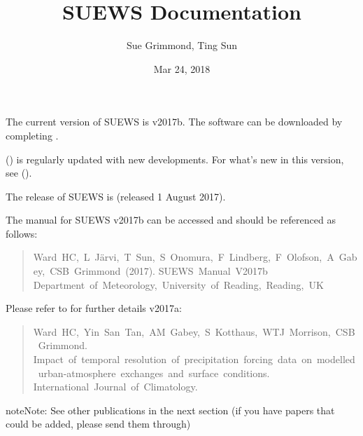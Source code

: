 \documentclass[letterpaper,10pt,english]{sphinxmanual}
\title{SUEWS Documentation}
\date{Mar 24, 2018}
\author{Sue Grimmond, Ting Sun}
\begin{document}
\maketitle
\sphinxtableofcontents
{}\label{\detokenize{index::doc}}


The current version of SUEWS is v2017b. The software can be downloaded
by completing .

{\hyperref[\detokenize{index:index-page}]{}} () is regularly
updated with new developments. For what’s new in this version, see {\hyperref[\detokenize{version-history:new-latest}]{}} ().

The  release of SUEWS is  (released 1 August
2017).

The manual for SUEWS v2017b can be accessed
 and should be referenced as
follows:
\begin{quote}

Ward HC, L Järvi, T Sun, S Onomura, F Lindberg, F Olofson, A Gabey, CSB Grimmond (2017).
SUEWS Manual V2017b Department of Meteorology, University of Reading, Reading, UK
\end{quote}

Please refer to  for
further details v2017a:
\begin{quote}

Ward HC, Yin San Tan, AM Gabey, S Kotthaus, WTJ Morrison, CSB Grimmond.
Impact of temporal resolution of precipitation forcing data on modelled urban-atmosphere exchanges and surface conditions.
International Journal of Climatology.
\end{quote}

\begin{sphinxadmonition}{note}{Note:}
See other publications in the next section (if you have papers that could be added, please send them through)
\end{sphinxadmonition}
\end{document}
